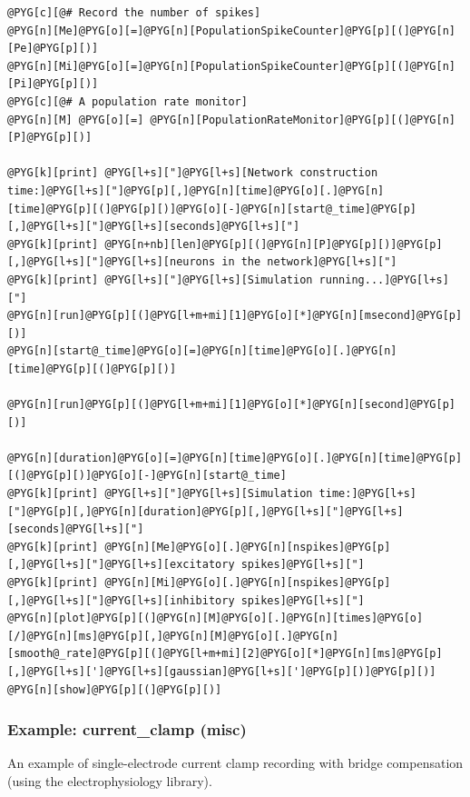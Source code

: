 \documentclass[letterpaper,10pt,english]{manual}
\begin{document}
\begin{Verbatim}[commandchars=@\[\]]
@PYG[c][@# Record the number of spikes]
@PYG[n][Me]@PYG[o][=]@PYG[n][PopulationSpikeCounter]@PYG[p][(]@PYG[n][Pe]@PYG[p][)]
@PYG[n][Mi]@PYG[o][=]@PYG[n][PopulationSpikeCounter]@PYG[p][(]@PYG[n][Pi]@PYG[p][)]
@PYG[c][@# A population rate monitor]
@PYG[n][M] @PYG[o][=] @PYG[n][PopulationRateMonitor]@PYG[p][(]@PYG[n][P]@PYG[p][)]

@PYG[k][print] @PYG[l+s]["]@PYG[l+s][Network construction time:]@PYG[l+s]["]@PYG[p][,]@PYG[n][time]@PYG[o][.]@PYG[n][time]@PYG[p][(]@PYG[p][)]@PYG[o][-]@PYG[n][start@_time]@PYG[p][,]@PYG[l+s]["]@PYG[l+s][seconds]@PYG[l+s]["]
@PYG[k][print] @PYG[n+nb][len]@PYG[p][(]@PYG[n][P]@PYG[p][)]@PYG[p][,]@PYG[l+s]["]@PYG[l+s][neurons in the network]@PYG[l+s]["]
@PYG[k][print] @PYG[l+s]["]@PYG[l+s][Simulation running...]@PYG[l+s]["]
@PYG[n][run]@PYG[p][(]@PYG[l+m+mi][1]@PYG[o][*]@PYG[n][msecond]@PYG[p][)]
@PYG[n][start@_time]@PYG[o][=]@PYG[n][time]@PYG[o][.]@PYG[n][time]@PYG[p][(]@PYG[p][)]

@PYG[n][run]@PYG[p][(]@PYG[l+m+mi][1]@PYG[o][*]@PYG[n][second]@PYG[p][)]

@PYG[n][duration]@PYG[o][=]@PYG[n][time]@PYG[o][.]@PYG[n][time]@PYG[p][(]@PYG[p][)]@PYG[o][-]@PYG[n][start@_time]
@PYG[k][print] @PYG[l+s]["]@PYG[l+s][Simulation time:]@PYG[l+s]["]@PYG[p][,]@PYG[n][duration]@PYG[p][,]@PYG[l+s]["]@PYG[l+s][seconds]@PYG[l+s]["]
@PYG[k][print] @PYG[n][Me]@PYG[o][.]@PYG[n][nspikes]@PYG[p][,]@PYG[l+s]["]@PYG[l+s][excitatory spikes]@PYG[l+s]["]
@PYG[k][print] @PYG[n][Mi]@PYG[o][.]@PYG[n][nspikes]@PYG[p][,]@PYG[l+s]["]@PYG[l+s][inhibitory spikes]@PYG[l+s]["]
@PYG[n][plot]@PYG[p][(]@PYG[n][M]@PYG[o][.]@PYG[n][times]@PYG[o][/]@PYG[n][ms]@PYG[p][,]@PYG[n][M]@PYG[o][.]@PYG[n][smooth@_rate]@PYG[p][(]@PYG[l+m+mi][2]@PYG[o][*]@PYG[n][ms]@PYG[p][,]@PYG[l+s][']@PYG[l+s][gaussian]@PYG[l+s][']@PYG[p][)]@PYG[p][)]
@PYG[n][show]@PYG[p][(]@PYG[p][)]
\end{Verbatim}

\resetcurrentobjects
\hypertarget{--doc-examples-misc_current_clamp}{}

\hypertarget{index-43}{}\subsubsection{Example: current\_clamp (misc)}

An example of single-electrode current clamp recording
with bridge compensation (using the electrophysiology library).
\end{document}
